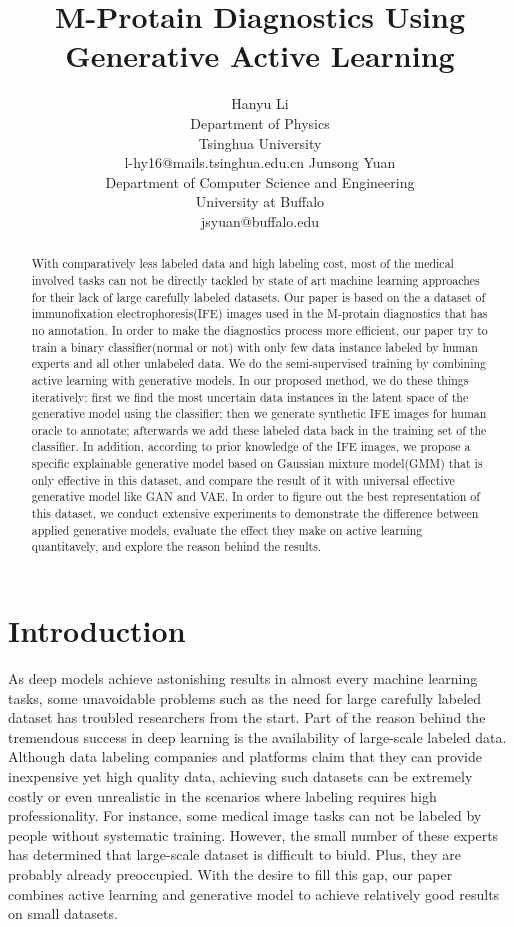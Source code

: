 \documentclass[letterpaper]{article}
\title{M-Protain Diagnostics Using Generative Active Learning}
\author{Hanyu Li\\
Department of Physics\\
Tsinghua University\\
l-hy16@mails.tsinghua.edu.cn
\And
Junsong Yuan\\
Department of Computer Science and Engineering\\
University at Buffalo\\
jsyuan@buffalo.edu}
\author{}
\begin{document}
\maketitle


\begin{abstract}
    With comparatively less labeled data and high labeling cost, most of the medical involved tasks can not be directly tackled by state of art machine learning approaches for their lack of large carefully labeled datasets. Our paper is based on the a dataset of immunofixation electrophoresis(IFE) images used in the M-protain diagnostics that has no annotation. In order to make the diagnostics process more efficient, our paper try to train a binary classifier(normal or not) with only few data instance labeled by human experts and all other unlabeled data. We do the semi-supervised training by combining active learning with generative models. In our proposed method, we do these things iteratively: first we find the most uncertain data instances in the latent space of the generative model using the classifier; then we generate synthetic IFE images for human oracle to annotate; afterwards we add these labeled data back in the training set of the classifier. In addition, according to prior knowledge of the IFE images, we propose a specific explainable generative model based on Gaussian mixture model(GMM) that is only effective in this dataset, and compare the result of it with universal effective generative model like GAN and VAE. In order to figure out the best representation of this dataset, we conduct extensive experiments to demonstrate the difference between applied generative models, evaluate the effect they make on active learning quantitavely, and explore the reason behind the results.
\end{abstract}


\section{Introduction}
\par As deep models achieve astonishing results in almost every machine learning tasks, some unavoidable problems such as the need for large carefully labeled dataset has troubled researchers from the start. Part of the reason behind the tremendous success in deep learning is the availability of large-scale labeled data\cite{sun2017revisiting}. Although data labeling companies and platforms claim that they can provide inexpensive yet high quality data\cite{buhrmester2011amazon}, achieving such datasets can be extremely costly or even unrealistic in the scenarios where labeling requires high professionality. For instance, some medical image tasks can not be labeled by people without systematic training. However, the small number of these experts has determined that large-scale dataset is difficult to biuld. Plus, they are probably already preoccupied. With the desire to fill this gap, our paper combines active learning and generative model to achieve relatively good results on small datasets.
\end{document}
